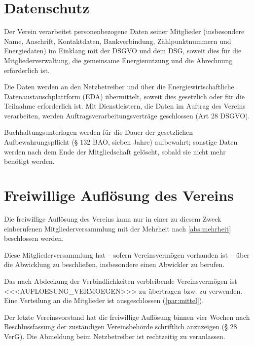 \documentclass[a4paper,11pt]{article}
\begin{document}
\section{Datenschutz}\label{par:datenschutz}
\begin{absaetze}
  \item Der Verein verarbeitet personenbezogene Daten seiner Mitglieder (insbesondere Name, Anschrift,
        Kontaktdaten, Bankverbindung, Zählpunktnummern und Energiedaten) im Einklang mit der DSGVO und dem DSG,
        soweit dies für die Mitgliederverwaltung, die gemeinsame Energienutzung und die Abrechnung erforderlich ist.
  \item Die Daten werden an den Netzbetreiber und über die Energiewirtschaftliche Datenaustauschplattform (EDA)
        übermittelt, soweit dies gesetzlich oder für die Teilnahme erforderlich ist. Mit Dienstleistern, die Daten im
        Auftrag des Vereins verarbeiten, werden Auftragsverarbeitungsverträge geschlossen (Art 28 DSGVO).
  \item Buchhaltungsunterlagen werden für die Dauer der gesetzlichen Aufbewahrungspflicht (§ 132 BAO, sieben Jahre)
        aufbewahrt; sonstige Daten werden nach dem Ende der Mitgliedschaft gelöscht, sobald sie nicht mehr benötigt
        werden.
\end{absaetze}

\section{Freiwillige Auflösung des Vereins}\label{par:aufloesung}
\begin{absaetze}
  \item Die freiwillige Auflösung des Vereins kann nur in einer zu diesem Zweck einberufenen Mitgliederversammlung
        mit der Mehrheit nach \ref{abs:mehrheit} beschlossen werden.
  \item Diese Mitgliederversammlung hat – sofern Vereinsvermögen vorhanden ist – über die Abwicklung zu beschließen,
        insbesondere einen Abwickler zu berufen.
  \item Das nach Abdeckung der Verbindlichkeiten verbleibende Vereinsvermögen ist <<<AUFLOESUNG_VERMOEGEN>>> zu
        übertragen bzw. zu verwenden. Eine Verteilung an die Mitglieder ist ausgeschlossen (\ref{par:mittel}).
  \item Der letzte Vereinsvorstand hat die freiwillige Auflösung binnen vier Wochen nach Beschlussfassung der
        zuständigen Vereinsbehörde schriftlich anzuzeigen (§ 28 VerG). Die Abmeldung beim Netzbetreiber ist rechtzeitig
        zu veranlassen.
\end{absaetze}
\end{document}
